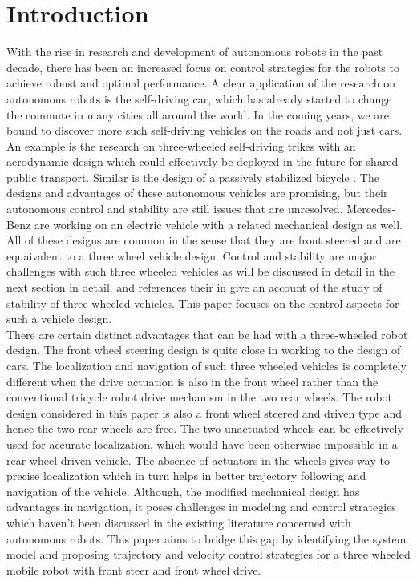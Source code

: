 \documentclass[conference]{IEEEtran}
\begin{document}
\section{Introduction}
With the rise in research and development of autonomous robots in the past decade, there has been an increased focus on control strategies for the robots to achieve robust and optimal performance. A clear application of the research on autonomous robots is the self-driving car, which has already started to change the commute in many cities all around the world. In the coming years, we are bound to discover more such self-driving vehicles on the roads and not just cars. An example is the research on three-wheeled self-driving trikes \cite{tyler} with an aerodynamic design which could effectively be deployed in the future for shared public transport. Similar is the design of a passively stabilized bicycle \cite{own}. The designs and advantages of these autonomous vehicles are promising, but their autonomous control and stability are still issues that are unresolved. Mercedes-Benz are working on an electric vehicle \cite{mercedes} with a related mechanical design as well. All of these designs are common in the sense that they are front steered and are equaivalent to a three wheel vehicle design. Control and stability are major challenges with such three wheeled vehicles as will be discussed in detail in the next section in detail. \cite{jignesh} and references their in give an account of the study of stability of three wheeled vehicles. This paper focuses on the control aspects for such a vehicle design. \\
There are certain distinct advantages that can be had with a three-wheeled robot design. The front wheel steering design is quite close in working to the design of cars. The localization and navigation of such three wheeled vehicles is completely different when the drive actuation is also in the front wheel rather than the conventional tricycle robot drive mechanism in the two rear wheels. The robot design considered in this paper is also a front wheel steered and driven type and hence the two rear wheels are free. The two unactuated wheels can be effectively used for accurate localization, which would have been otherwise impossible in a rear wheel driven vehicle. The absence of actuators in the wheels gives way to precise localization which in turn helps in better trajectory following and navigation of the vehicle. Although, the modified mechanical design has advantages in navigation, it poses challenges in modeling and control strategies which haven't been discussed in the existing literature concerned with autonomous robots. This paper aims to bridge this gap by identifying the system model and proposing trajectory and velocity control strategies for a three wheeled mobile robot with front steer and front wheel drive. 
\end{document}
